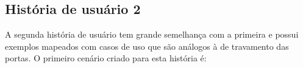 \subsection{História de usuário 2}

A segunda história de usuário tem grande semelhança com a primeira e possui exemplos mapeados com casos de uso que são análogos à de travamento das portas. O 
primeiro cenário criado para esta história é:




